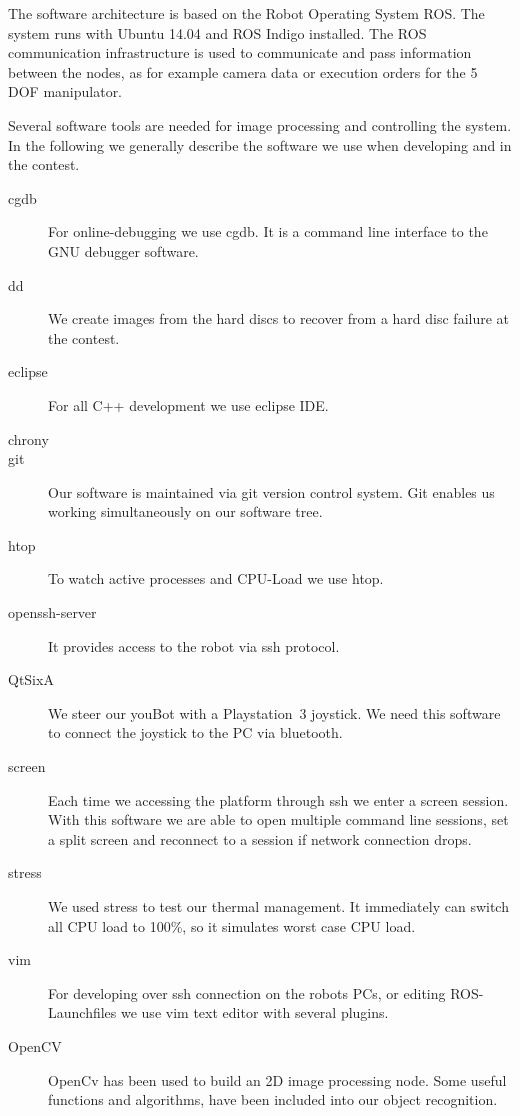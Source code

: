 The software architecture is based on the Robot Operating System ROS. The system runs with Ubuntu 14.04 and ROS Indigo installed. The ROS communication infrastructure is used to communicate and pass information between the nodes, as for example camera data or execution orders for the 5 DOF manipulator. 

Several software tools are needed for image processing and controlling the system. In the following we generally describe the software we use when developing and in the contest.

\begin{description}
	\item [cgdb] For online-debugging we use cgdb. It is a command line interface to the GNU debugger software. 
	\item [dd] We create images from the hard discs to recover from a hard disc failure at the contest.
	\item [eclipse] For all C++ development we use eclipse IDE. 
	\item [chrony] 
	\item [git] Our software is maintained via git version  control system. Git enables us working simultaneously on our software tree.  
	\item [htop] To watch active processes and CPU-Load we use htop. 
	\item [openssh-server] It provides access to the robot via ssh protocol. 
	\item [QtSixA] We steer our youBot with a Playstation~3 joystick. We need this software to connect the joystick to the PC via bluetooth.
	\item  [screen] Each time we accessing the platform through ssh we enter a screen session. With this software we are able to open multiple command line sessions, set a split screen and reconnect to a session if network connection drops. 
	\item [stress] We used stress to test our thermal management. It immediately can switch all CPU load to 100\%, so it simulates worst case CPU load. 
	\item [vim] For developing over ssh connection on the robots PCs, or editing ROS-Launchfiles we use vim text editor with several plugins.
	\item [OpenCV] OpenCv has been used to build an 2D image processing node. Some useful functions and algorithms, have been included into our object recognition.
\end{description}

